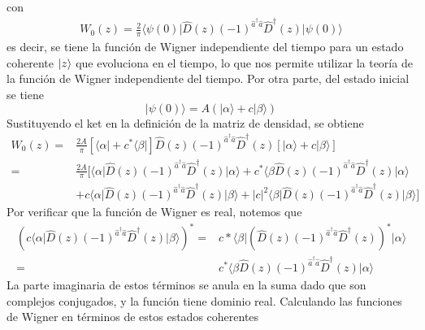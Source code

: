 con
\begin{align*}
  W_{0}(z) = \frac{2}{\pi} \langle \psi(0)\vert \hat{D}(z) (-1)^{\hat{a}^{\dagger}\hat{a}} \hat{D}^{\dagger}(z) \vert \psi(0) \rangle
\end{align*}
es decir, se tiene la función de Wigner independiente del tiempo para un estado coherente $\ket{z}$ que evoluciona en el tiempo, lo que nos permite utilizar la teoría de la función de Wigner independiente del tiempo. Por otra parte, del estado inicial se tiene
\begin{equation*}
  \vert \psi(0) \rangle = A \left(\vert \alpha \rangle + c \vert  \beta\rangle \right)
\end{equation*}
Sustituyendo el ket en la definición de la matriz de densidad, se obtiene
\begin{align*}
  W_0(z) = & \frac{2A}{\pi} \left[ \langle \alpha \vert + c^* \langle \beta \vert \right] \hat{D}(z) (-1)^{\hat{a}^\dagger \hat{a}} \hat{D}^\dagger(z) \left[ \vert\alpha\rangle + c\vert \beta \rangle \right]                             \\
  =        & \frac{2A}{\pi} \bigg[ \langle \alpha \vert \hat{D}(z) (-1)^{\hat{a}^\dagger \hat{a}} \hat{D}^\dagger(z) \vert\alpha\rangle + c^* \langle \beta \hat{D}(z) (-1)^{\hat{a}^\dagger \hat{a}} \hat{D}^\dagger(z) \vert\alpha\rangle \\ & + c \langle \alpha\vert \hat{D}(z) (-1)^{\hat{a}^\dagger \hat{a}} \hat{D}^\dagger(z) \vert\beta\rangle + |c|^2\langle \beta \vert \hat{D}(z) (-1)^{\hat{a}^\dagger \hat{a}} \hat{D}^\dagger(z) \vert\beta\rangle \bigg] \
\end{align*}
Por verificar que la función de Wigner es real, notemos que
\begin{align*}
  \left( c \langle \alpha\vert \hat{D}(z) (-1)^{\hat{a}^\dagger \hat{a}} \hat{D}^\dagger(z) \vert\beta\rangle \right)^* = & c* \langle \beta\vert \left( \hat{D}(z) (-1)^{\hat{a}^\dagger \hat{a}} \hat{D}^\dagger(z) \right)^* \vert\alpha\rangle
  \\ =& c^* \langle \beta \hat{D}(z) (-1)^{\hat{a}^\dagger \hat{a}} \hat{D}^\dagger(z) \vert\alpha\rangle
\end{align*}
La parte imaginaria de estos términos se anula en la suma dado que son complejos conjugados, y la función tiene dominio real. Calculando las funciones de Wigner en términos de estos estados coherentes
